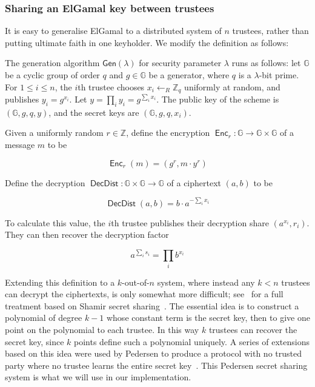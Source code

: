 \documentclass[12pt,a4paper]{article}
\DeclareMathOperator{\Enc}{\mathsf{Enc}}
\DeclareMathOperator{\DecDist}{\mathsf{DecDist}}
\theoremstyle{definition}
\newcounter{protocol}
\begin{document}
\subsubsection{Sharing an ElGamal key between trustees}
It is easy to generalise ElGamal to a distributed system of $n$ trustees, rather than putting ultimate faith in one keyholder. We modify the definition as follows:
\begin{definition}
    The generation algorithm $\mathsf{Gen}(\lambda)$ for security parameter $\lambda$ runs as follows: let $\mathbb{G}$ be a cyclic group of order $q$ and $g\in\mathbb{G}$ be a generator, where $q$ is a $\lambda$-bit prime. For $1\leq i\leq n$, the $i$th trustee chooses $x_i\gets_R\mathbb{Z}_q$ uniformly at random, and publishes $y_i=g^{x_i}$. Let $y=\prod_i y_i=g^{\sum_i x_i}$. The public key of the scheme is $(\mathbb{G}, g, q, y)$, and the secret keys are $(\mathbb{G}, g, q, x_i)$.

    Given a uniformly random $r\in\mathbb{Z}$, define the encryption $\Enc_r:\mathbb{G}\rightarrow\mathbb{G}\times\mathbb{G}$ of a message $m$ to be
    
    $$\Enc_r(m) = (g^r, m\cdot y^r)$$

    Define the decryption $\DecDist:\mathbb{G}\times\mathbb{G}\rightarrow \mathbb{G}$ of a ciphertext $(a, b)$ to be
    
    $$\DecDist(a, b)=b\cdot a^{-\sum_i x_i}$$
    
    To calculate this value, the $i$th trustee publishes their decryption share $\left(a^{x_i}, r_i\right)$. They can then recover the decryption factor
    
    $$a^{\sum_i s_i}=\prod_i{b^{x_i}}$$
\end{definition}
Extending this definition to a $k$-out-of-$n$ system, where instead any $k<n$ trustees can decrypt the ciphertexts, is only somewhat more difficult; see~\cite{pedersen1991threshold} for a full treatment based on Shamir secret sharing~\cite{shamir1979share}. The essential idea is to construct a polynomial of degree $k-1$ whose constant term is the secret key, then to give one point on the polynomial to each trustee. In this way $k$ trustees can recover the secret key, since $k$ points define such a polynomial uniquely. A series of extensions based on this idea were used by Pedersen to produce a protocol with no trusted party where no trustee learns the entire secret key~\cite{pedersen1991threshold}. This Pedersen secret sharing system is what we will use in our implementation.
\end{document}

